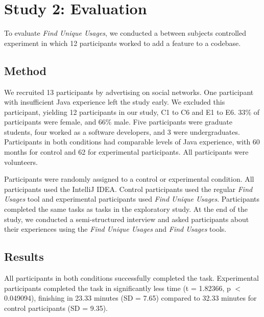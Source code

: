 \documentclass[conference]{IEEEtran}
\begin{document}
\section{Study 2: Evaluation}
To evaluate \textit{Find Unique Usages}, we conducted a between subjects controlled experiment in which 12 participants worked to add a feature to a codebase. 
\subsection{Method}
We recruited 13 participants by advertising on social networks. One participant with insufficient Java experience left the study early. We excluded this participant, yielding 12 participants in our study, C1 to C6 and E1 to E6. 
33\% of participants were female, and 66\% male. Five participants were graduate students, four worked as a software developers, and 3 were undergraduates. Participants in both conditions had comparable levels of Java experience, with 60 months for control and 62 for experimental participants. All participants were volunteers.\par

Participants were randomly assigned to a control  or experimental condition. All participants used the IntelliJ IDEA. Control participants used the regular \textit{Find Usages} tool and experimental participants used \textit{Find Unique Usages}.
Participants completed the same tasks as tasks in the exploratory study.
At the end of the study, we conducted a semi-structured interview and asked participants about their experiences using the \textit{Find Unique Usages} and \textit{Find Usages} tools.


\subsection{Results}
All participants in both conditions successfully completed the task. Experimental participants completed the task in significantly less time (t = 1.82366, p $<$ 0.049094), finishing in 23.33 minutes (SD = 7.65) compared to 32.33 minutes for control participants (SD = 9.35).

\end{document}
